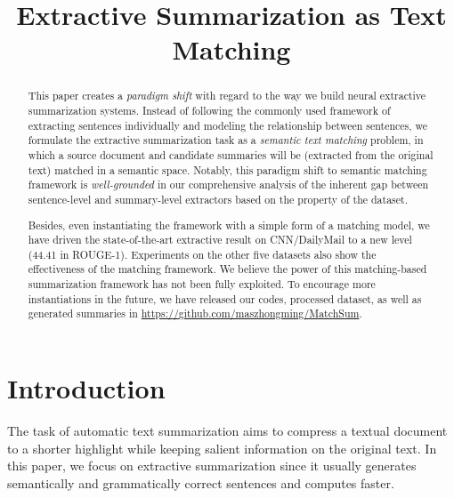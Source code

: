 \title{Extractive Summarization as Text Matching}



\maketitle

\begin{abstract}

This paper creates a \emph{paradigm shift} with regard to the way we build neural extractive summarization systems. Instead of following the commonly used framework of extracting sentences individually and modeling the relationship between sentences, we formulate the extractive summarization task as a \emph{semantic text matching} problem, in which a source document and candidate summaries will be (extracted from the original text) matched in a semantic space. Notably, this paradigm shift to semantic matching framework is \emph{well-grounded} in our comprehensive analysis of the inherent gap between sentence-level and summary-level extractors based on the property of the dataset.

Besides, even instantiating the framework with a simple form of a matching model, we have driven the state-of-the-art extractive result on CNN/DailyMail to a new level (44.41 in ROUGE-1). Experiments on the other five datasets also show the effectiveness of the matching framework.  We believe the power of this matching-based summarization framework has not been fully exploited. To encourage more instantiations in the future,  we have released our codes, processed dataset, as well as generated summaries in {\url{https://github.com/maszhongming/MatchSum}}.

\end{abstract}

\section{Introduction}

The task of automatic text summarization aims to compress a textual document to a shorter highlight while keeping salient information on the original text.
In this paper, we focus on extractive summarization since it usually generates semantically and grammatically correct sentences \cite{dong2018banditsum,nallapati2017summarunner} and computes faster.

